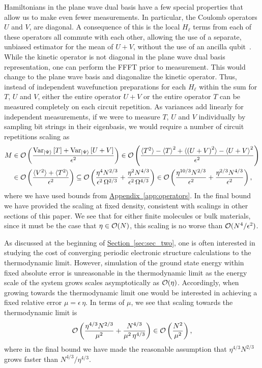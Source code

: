 \documentclass[superscriptaddress,aps,pra,nofootinbib,notitlepage,10pt,longbibliography]{revtex4-1}
\renewcommand{\sec}[1]{\hyperref[sec:#1]{Section~\ref*{sec:#1}}}
\DeclareRobustCommand{\app}[1]{\hyperref[app:#1]{Appendix~\ref*{app:#1}}}
\def\avg#1{\mathinner{\langle{#1}\rangle}}
\def\ket#1{\mathinner{|{#1}\rangle}}
\begin{document}
Hamiltonians in the plane wave dual basis have a few special properties that allow us to make even fewer measurements. In particular, the Coulomb operators $U$ and $V$, are diagonal. A consequence of this is the local $H_\ell$ terms from each of these operators all commute with each other, allowing the use of a separate, unbiased estimator for the mean of $U + V$, without the use of an ancilla qubit~\cite{Santagati2016}. While the kinetic operator is not diagonal in the plane wave dual basis representation, one can perform the FFFT prior to measurement. This would change to the plane wave basis and diagonalize the kinetic operator. Thus, instead of independent wavefunction preparations for each $H_\ell$ within the sum for $T$, $U$ and $V$, either the entire operator $U + V$ or the entire operator $T$ can be measured completely on each circuit repetition. As variances add linearly for independent measurements, if we were to measure $T$, $U$ and $V$ individually by sampling bit strings in their eigenbasis, we would require a number of circuit repetitions scaling as
\begin{align}
\label{eq:diagonal_measure}
M & \in {\cal O}\left(\frac{\text{Var}_{\ket{\Psi}}\left[T\right] + \text{Var}_{\ket{\Psi}}\left[U + V\right]}{\epsilon^2}\right) 
%
\in {\cal O}\left(\frac{ \avg{T^2} - \avg{T}^2 + \avg{\left(U + V\right)^2} - \avg{U + V}^2}{\epsilon^2}\right)\\
%
& \in {\cal O}\left(\frac{\avg{V^2} + \avg{T^2}}{\epsilon^2}\right) \subseteq {\cal O}\left(\frac{\eta^4 N^{2/3}}{\epsilon^2 \, \Omega^{2/3}} + \frac{\eta^2 N^{4/3}}{\epsilon^2 \, \Omega^{4/3}}\right)
%
\in {\cal O}\left(\frac{\eta^{10/3} N^{2/3}}{\epsilon^2} + \frac{\eta^{2/3} N^{4/3}}{\epsilon^2}\right)\nonumber,
\end{align}
where we have used bounds from \app{operators}. In the final bound we have provided the scaling at fixed density, consistent with scalings in other sections of this paper. We see that for either finite molecules or bulk materials, since it must be the case that $\eta \in {\cal O}(N)$, this scaling is no worse than ${\cal O}(N^4/\epsilon^2)$.

As discussed at the beginning of \sec{sec_two}, one is often interested in studying the cost of converging periodic electronic structure calculations to the thermodynamic limit.  However, simulation of the ground state energy within fixed absolute error is unreasonable in the thermodynamic limit as the energy scale of the system grows scales asymptotically as ${\cal O}(\eta)$. Accordingly, when growing towards the thermodynamic limit one would be interested in achieving a fixed relative error $\mu = \epsilon \, \eta$. In terms of $\mu$, we see that scaling towards the thermodynamic limit is
\begin{equation}
{\cal O}\left(\frac{\eta^{4/3} N^{2/3}}{\mu^2} + \frac{N^{4/3}}{\mu^2\, \eta^{4/3}}\right)
%
\in {\cal O}\left(\frac{N^{2}}{\mu^2}\right),
\end{equation}
where in the final bound we have made the reasonable assumption that $\eta^{4/3}N^{2/3}$ grows faster than $N^{4/3} / \eta^{4/3}$.
\end{document}
